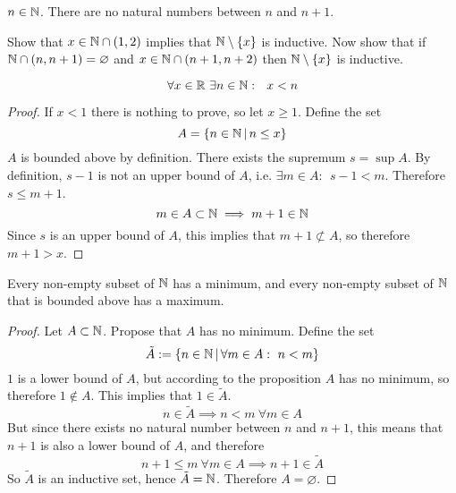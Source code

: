 \documentclass[../../script.tex]{subfiles}
\begin{document}
\begin{thm}
$n \in \mathbb{N}$. There are no natural numbers between $n$ and $n + 1$.
\end{thm}
\begin{hproof}
Show that $x \in \mathbb{N} \cap (1, 2)$ implies that $\mathbb{N} \setminus \{x\}$ is inductive. Now show that if $\mathbb{N} \cap (n, n+1) = \varnothing$ and $x \in \mathbb{N} \cap (n + 1, n + 2)$ then $\mathbb{N} \setminus \{x\}$ is inductive.
\end{hproof}

\begin{thm}
\[
	\forall x \in \mathbb{R} ~\exists n \in \mathbb{N}: ~~x<n
\]
\end{thm}
\begin{proof}
If $x < 1$ there is nothing to prove, so let $x \ge 1$. Define the set 
\begin{equation}
	A = \{n \in \mathbb{N} \,\vert\, n \le x\}
\end{equation}
$A$ is bounded above by definition. There exists the supremum $s = \sup A$. By definition, $s-1$ is not an upper bound of $A$, i.e. $\exists m \in A: ~~s-1 < m$. Therefore $s \le m + 1$.
\begin{equation}
	m \in A \subset \mathbb{N} \implies m + 1 \in \mathbb{N}
\end{equation}
Since $s$ is an upper bound of $A$, this implies that $m+1 \not\subset A$, so therefore $m + 1 > x$.
\end{proof}

\begin{cor}\label{cor:minimum}
Every non-empty subset of $\mathbb{N}$ has a minimum, and every non-empty subset of $\mathbb{N}$ that is bounded above has a maximum.
\end{cor}
\begin{proof}
Let $A \subset \mathbb{N}$. Propose that $A$ has no minimum. Define the set
\begin{equation}
	\tilde{A} := \{n \in \mathbb{N} \,\vert\, \forall m \in A: ~n < m\}
\end{equation}
$1$ is a lower bound of $A$, but according to the proposition $A$ has no minimum, so therefore $1 \notin A$. This implies that $1 \in \tilde{A}$. 
\begin{equation}
	n \in \tilde{A} \implies n < m ~\forall m \in A
\end{equation}
But since there exists no natural number between $n$ and $n+1$, this means that $n+1$ is also a lower bound of $A$, and therefore
\begin{equation}
	n+1 \le m ~\forall m \in A \implies n+1 \in \tilde{A}
\end{equation}
So $\tilde{A}$ is an inductive set, hence $\tilde{A} = \mathbb{N}$. Therefore $A = \varnothing$.
\end{proof}
\end{document}
